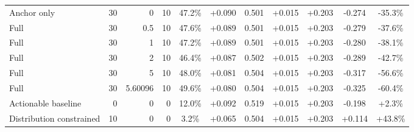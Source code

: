 \begin{table}[htbp]
\begin{tabular}{lrrrccccccc}
Anchor only & 30 & 0 & 10 & 47.2\% & +0.090 & 0.501 & +0.015 & +0.203 & -0.274 & -35.3\% \\
Full & 30 & 0.5 & 10 & 47.6\% & +0.089 & 0.501 & +0.015 & +0.203 & -0.279 & -37.6\% \\
Full & 30 & 1 & 10 & 47.2\% & +0.089 & 0.501 & +0.015 & +0.203 & -0.280 & -38.1\% \\
Full & 30 & 2 & 10 & 46.4\% & +0.087 & 0.502 & +0.015 & +0.203 & -0.289 & -42.7\% \\
Full & 30 & 5 & 10 & 48.0\% & +0.081 & 0.504 & +0.015 & +0.203 & -0.317 & -56.6\% \\
Full & 30 & 5.60096 & 10 & 49.6\% & +0.080 & 0.504 & +0.015 & +0.203 & -0.325 & -60.4\% \\
Actionable baseline & 0 & 0 & 0 & 12.0\% & +0.092 & 0.519 & +0.015 & +0.203 & -0.198 & +2.3\% \\
Distribution constrained & 10 & 0 & 0 & 3.2\% & +0.065 & 0.504 & +0.015 & +0.203 & +0.114 & +43.8\% \\
\bottomrule
\end{tabular}
\end{table}